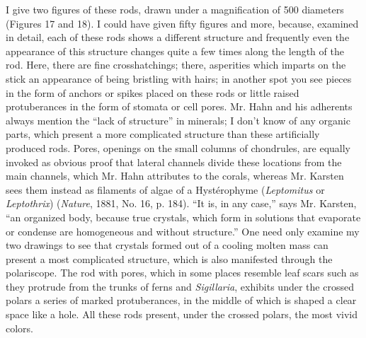 \documentclass[a4paper, 12pt, oneside]{article}
\begin{document}
I give two figures of these rods, drawn under a magnification of 500 diameters (Figures 17 and 18). I could have given fifty figures and more, because, examined in detail, each of these rods shows a different structure and frequently even the appearance of this structure changes quite a few times along the length of the rod. Here, there are fine crosshatchings; there, asperities which imparts on the stick an appearance of being bristling with hairs; in another spot you see pieces in the form of anchors or spikes placed on these rods or little raised protuberances in the form of stomata or cell pores. Mr. Hahn and his adherents always mention the ``lack of structure'' in minerals; I don't know of any organic parts, which present a more complicated structure than these artificially produced rods. Pores, openings on the small columns of chondrules, are equally invoked as obvious proof that lateral channels divide these locations from the main channels, which Mr. Hahn attributes to the corals, whereas Mr. Karsten sees them instead as filaments of algae of a Hystérophyme (\emph{Leptomitus} or \emph{Leptothrix}) (\emph{Nature}, 1881, No. 16, p. 184). ``It is, in any case,'' says Mr. Karsten, ``an organized body, because true crystals, which form in solutions that evaporate or condense are homogeneous and without structure.'' One need only examine my two drawings to see that crystals formed out of a cooling molten mass can present a most complicated structure, which is also manifested through the polariscope. The rod with pores, which in some places resemble leaf scars such as they protrude from the trunks of ferns and \emph{Sigillaria}, exhibits under the crossed polars a series of marked protuberances, in the middle of which is shaped a clear space like a hole. All these rods present, under the crossed polars, the most vivid colors.
\end{document}
